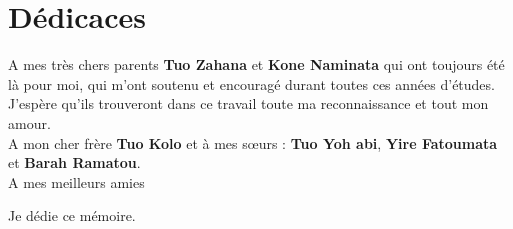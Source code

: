 \chapter*{Dédicaces}
	\thispagestyle{empty}
	
	A mes très chers parents \textbf{Tuo Zahana} et \textbf{Kone Naminata} qui ont toujours été là pour moi, qui m'ont soutenu et encouragé durant toutes ces années d'études. J'espère qu'ils trouveront dans ce travail toute ma reconnaissance et tout mon
	amour.\\
	
	A mon cher frère \textbf{Tuo Kolo} et à mes sœurs : \textbf{Tuo Yoh abi}, \textbf{Yire Fatoumata} et \textbf{Barah Ramatou}.\\
	
	
	A mes meilleurs amies
	
	\begin{center}
		Je dédie ce mémoire.
	\end{center}